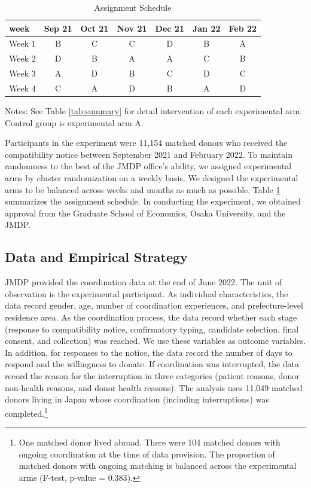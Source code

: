 \documentclass[
]{article}
\begin{document}
\begin{table}

\caption{\label{tab:assignment}Assignment Schedule}
\centering
\fontsize{9}{11}\selectfont
\fontsize{9}{11}\selectfont
\begin{threeparttable}
\begin{tabular}[t]{lcccccc}
\toprule
week & Sep 21 & Oct 21 & Nov 21 & Dec 21 & Jan 22 & Feb 22\\
\midrule
Week 1 & B & C & C & D & B & A\\
Week 2 & D & B & A & A & C & B\\
Week 3 & A & D & B & C & D & C\\
Week 4 & C & A & D & B & A & D\\
\bottomrule
\end{tabular}
\begin{tablenotes}
\item Notes: See Table \ref{tab:summary} for detail intervention of each experimental arm. Control group is experimental arm A.
\end{tablenotes}
\end{threeparttable}
\end{table}

Participants in the experiment were 11,154 matched donors who received the compatibility notice between September 2021 and February 2022. To maintain randomness to the best of the JMDP office's ability, we assigned experimental arms by cluster randomization on a weekly basis. We designed the experimental arms to be balanced across weeks and months as much as possible. Table \ref{tab:assignment} summarizes the assignment schedule. In conducting the experiment, we obtained approval from the Graduate School of Economics, Osaka University, and the JMDP.

\hypertarget{data-and-empirical-strategy}{%
\subsection{Data and Empirical Strategy}\label{data-and-empirical-strategy}}

JMDP provided the coordination data at the end of June 2022. The unit of observation is the experimental participant. As individual characteristics, the data record gender, age, number of coordination experiences, and prefecture-level residence area. As the coordination process, the data record whether each stage (response to compatibility notice, confirmatory typing, candidate selection, final consent, and collection) was reached. We use these variables as outcome variables. In addition, for responses to the notice, the data record the number of days to respond and the willingness to donate. If coordination was interrupted, the data record the reason for the interruption in three categories (patient reasons, donor non-health reasons, and donor health reasons). The analysis uses 11,049 matched donors living in Japan whose coordination (including interruptions) was completed.\footnote{One matched donor lived abroad. There were 104 matched donors with ongoing coordination at the time of data provision. The proportion of matched donors with ongoing matching is balanced across the experimental arms (F-test, p-value = \(0.383\)).}
\end{document}

